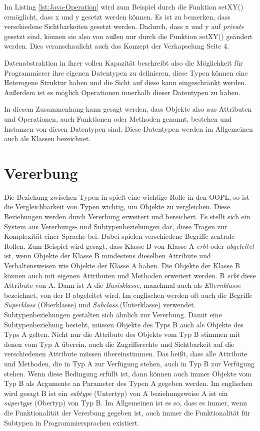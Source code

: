 \documentclass[
	12pt, %
	a4paper,
	listof=totoc, %
	bibliography=totoc, %
	numbers=noenddot, %
	ngerman, %
	headsepline, %
	oneside %
	]{scrbook} %
\begin{document}
Im Listing \ref{lst:Java-Operation} wird zum Beispiel durch die Funktion \glqq setXY()\grqq{}  ermöglicht, dass x und y gesetzt werden können. Es ist zu bemerken, dass verschiedene Sichtbarkeiten gesetzt werden. Dadurch, dass x und y auf \emph{private} gesetzt sind, können sie also von außen nur durch die Funktion \glqq setXY()\grqq{} geändert werden.  
Dies veranschaulicht auch das Konzept der Verkapselung \cite{OOPL} Seite 4.  

Datenabstraktion in ihrer vollen Kapazität beschreibt also die Möglichkeit für Programmierer ihre eigenen Datentypen zu definieren, diese Typen können eine Heterogene Struktur haben und die Sicht auf diese kann eingeschränkt werden. Außerdem ist es möglich Operationen innerhalb dieser Datentypen zu haben.  

In diesem Zusammenhang kann gesagt werden, dass Objekte also aus Attributen und Operationen, auch Funktionen oder Methoden genannt, bestehen und Instanzen von diesen Datentypen sind. Diese Datentypen werden im Allgemeinen auch als Klassen bezeichnet.


\section{Vererbung}\label{sec:Vererbung}
Die Beziehung zwischen Typen in spielt eine wichtige Rolle in den \gls{OOPL}, so ist die Vergleichbarkeit von Typen wichtig, um Objekte zu vergleichen.  
Diese Beziehungen werden durch Vererbung erweitert und bereichert. Es stellt sich ein System aus Vererbungs- und Subtypenbeziehungen dar, diese Tragen zur Komplexität einer Sprache bei. Dabei spielen verschiedene Begriffe zentrale Rollen.  
Zum Beispiel wird gesagt, dass Klasse B von Klasse A \emph{erbt} oder \emph{abgeleitet} ist, wenn Objekte der Klasse B mindestens dieselben Attribute und Verhaltensweisen wie Objekte der Klasse A haben. Die Objekte der Klasse B können auch mit eigenen Attributen und Methoden erweitert werden.  
B \emph{erbt} diese Attribute von A. Dann ist A die \emph{Basisklasse}, manchmal auch als \emph{Elternklasse} bezeichnet, von der B abgeleitet wird.  
Im englischen werden oft auch die Begriffe \emph{Superklass} (Oberklasse) und \emph{Subclass} (Unterklasse) verwendet.  
Subtypenbeziehungen gestalten sich ähnlich zur Vererbung. Damit eine Subtypenbeziehung besteht, müssen Objekte des Typs B auch als Objekte des Typs A gelten. Nicht nur die Attribute des Objekts vom Typ B stimmen mit denen vom Typ A überein, auch die Zugriffsrechte und Sichtbarkeit auf die verschiedenen Attribute müssen übereinstimmen. Das heißt, dass alle Attribute und Methoden, die in Typ A zur Verfügung stehen, auch in Typ B zur Verfügung stehen.  
Wenn diese Bedingung erfüllt ist, dann können auch immer Objekte vom Typ B als Argumente an Parameter des Typen A gegeben werden. Im englischen wird gesagt B ist ein \emph{subtype} (Untertyp) von A beziehungsweise A ist ein \emph{supertype} (Obertyp) von Typ B. Im Allgemeinen ist es so, dass es immer, wenn die Funktionalität der Vererbung gegeben ist, auch immer die Funktionalität für Subtypen in Programmiersprachen existiert.  
  
\end{document}
